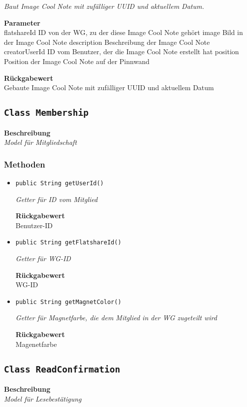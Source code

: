 \begin{itemize}
    	\textit{Baut Image Cool Note mit zufälliger UUID und aktuellem Datum.}
    	
    	\textbf{Parameter} \\
    	flatshareId ID von der WG, zu der diese Image Cool Note gehört
    	image Bild in der Image Cool Note
    	description Beschreibung der Image Cool Note
    	creatorUserId ID vom Benutzer, der die Image Cool Note erstellt hat
    	position Position der Image Cool Note auf der Pinnwand
    	
    	\textbf{Rückgabewert} \\
    	Gebaute Image Cool Note mit zufälliger UUID und aktuellem Datum
    \end{itemize}
    \subsection{\texttt{Class Membership}}
    \textbf{Beschreibung} \\
    \textit{Model für Mitgliedschaft}
    \subsubsection*{Methoden}
    \begin{itemize}
    	\item{\texttt{public String getUserId()}}
    	
    	\textit{Getter für ID vom Mitglied}
    	
    	
    	
    	\textbf{Rückgabewert} \\
    	Benutzer-ID        \item{\texttt{public String getFlatshareId()}}
    	
    	\textit{Getter für WG-ID}
    	
    	
    	
    	\textbf{Rückgabewert} \\
    	WG-ID        \item{\texttt{public String getMagnetColor()}}
    	
    	\textit{Getter für Magnetfarbe, die dem Mitglied in der WG zugeteilt wird}
    	
    	
    	
    	\textbf{Rückgabewert} \\
    	Magenetfarbe
    \end{itemize}
    \subsection{\texttt{Class ReadConfirmation}}
    \textbf{Beschreibung} \\
    \textit{Model für Lesebestätigung}
